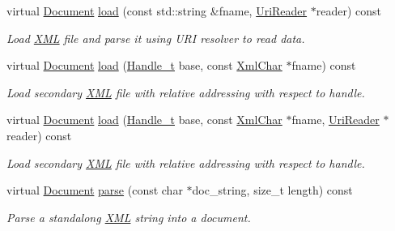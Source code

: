 \begin{DoxyCompactItemize}
virtual \hyperlink{class_d_d4hep_1_1_x_m_l_1_1_document}{Document} \hyperlink{class_d_d4hep_1_1_x_m_l_1_1_document_handler_a6c1ba9dd9d4ee0e8da6092eecb4973f3}{load} (const std::string \&fname, \hyperlink{class_d_d4hep_1_1_x_m_l_1_1_uri_reader}{UriReader} $\ast$reader) const 
\begin{DoxyCompactList}\small\item\em Load \hyperlink{namespace_d_d4hep_1_1_x_m_l}{XML} file and parse it using URI resolver to read data. \item\end{DoxyCompactList}\item 
virtual \hyperlink{class_d_d4hep_1_1_x_m_l_1_1_document}{Document} \hyperlink{class_d_d4hep_1_1_x_m_l_1_1_document_handler_a01cf9428db981f529baf264298f93645}{load} (\hyperlink{class_d_d4hep_1_1_x_m_l_1_1_handle__t}{Handle\_\-t} base, const \hyperlink{namespace_d_d4hep_1_1_x_m_l_a09e5d9cc86ed782f6826dfe0778c1815}{XmlChar} $\ast$fname) const 
\begin{DoxyCompactList}\small\item\em Load secondary \hyperlink{namespace_d_d4hep_1_1_x_m_l}{XML} file with relative addressing with respect to handle. \item\end{DoxyCompactList}\item 
virtual \hyperlink{class_d_d4hep_1_1_x_m_l_1_1_document}{Document} \hyperlink{class_d_d4hep_1_1_x_m_l_1_1_document_handler_a9f3c85019249435578aa3ead78ebd341}{load} (\hyperlink{class_d_d4hep_1_1_x_m_l_1_1_handle__t}{Handle\_\-t} base, const \hyperlink{namespace_d_d4hep_1_1_x_m_l_a09e5d9cc86ed782f6826dfe0778c1815}{XmlChar} $\ast$fname, \hyperlink{class_d_d4hep_1_1_x_m_l_1_1_uri_reader}{UriReader} $\ast$reader) const 
\begin{DoxyCompactList}\small\item\em Load secondary \hyperlink{namespace_d_d4hep_1_1_x_m_l}{XML} file with relative addressing with respect to handle. \item\end{DoxyCompactList}\item 
virtual \hyperlink{class_d_d4hep_1_1_x_m_l_1_1_document}{Document} \hyperlink{class_d_d4hep_1_1_x_m_l_1_1_document_handler_a81fd8a96ea381b6822ec360dcf62e38a}{parse} (const char $\ast$doc\_\-string, size\_\-t length) const 
\begin{DoxyCompactList}\small\item\em Parse a standalong \hyperlink{namespace_d_d4hep_1_1_x_m_l}{XML} string into a document. \item\end{DoxyCompactList}\item 

\end{DoxyCompactItemize}
